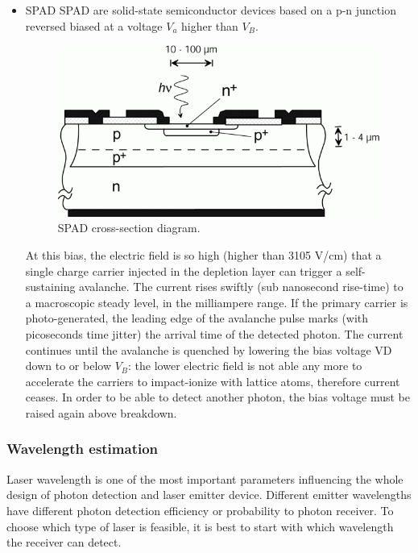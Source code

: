 \begin{itemize}
\item \acs{SPAD}
\ac{SPAD} are solid-state semiconductor devices based on a p-n junction reversed biased at a voltage $V_{a}$ higher than $V_{B}$.

\begin{figure}[ht!]
\centering
\includegraphics[scale = 0.7]{chapters/img/SPAD_Cross-section.png}
\caption{\acs{SPAD} cross-section diagram.}
\label{fig:SPAD_cross-section}
\end{figure}

At this bias, the electric field is so high (higher than 3105 V/cm) that a single charge carrier injected in the depletion layer can trigger a self-sustaining avalanche. The current rises swiftly (sub nanosecond rise-time) to a macroscopic steady level, in the milliampere range. If the primary carrier is photo-generated, the leading edge of the avalanche pulse marks (with picoseconds time jitter) the arrival time of the detected photon. The current continues until the avalanche is quenched by lowering the bias voltage VD down to or below $V_{B}$: the lower electric field is not able any more to accelerate the carriers to impact-ionize with lattice atoms, therefore current ceases. In order to be able to detect another photon, the bias voltage must be raised again above breakdown.\cite{SPAD_intro}

\end{itemize}


\subsubsection{Wavelength estimation}
\label{introReceiver}
Laser wavelength is one of the most important parameters influencing the whole design of photon detection and \acs{laser} emitter device. Different emitter wavelengths have different photon detection efficiency or probability to photon receiver. To choose which type of \acs{laser} is feasible, it is best to start with which wavelength the receiver can detect.

